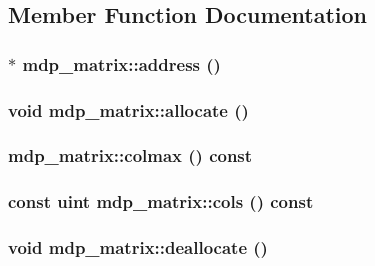\subsection{Member Function Documentation}
\hypertarget{classmdp__matrix_a557c3deb958c09b99f045df8d41a506e}{
\subsubsection[{address}]{ $\ast$ mdp\_\-matrix::address ()}}
\label{classmdp__matrix_a557c3deb958c09b99f045df8d41a506e}
\hypertarget{classmdp__matrix_a1a9cef75d472f8e7ab0665de46321030}{
\subsubsection[{allocate}]{\setlength{\rightskip}{0pt plus 5cm}void mdp\_\-matrix::allocate ()}}
\label{classmdp__matrix_a1a9cef75d472f8e7ab0665de46321030}
\hypertarget{classmdp__matrix_a006f666092b7aea1180728216474d13e}{
\subsubsection[{colmax}]{ mdp\_\-matrix::colmax () const}}
\label{classmdp__matrix_a006f666092b7aea1180728216474d13e}
\hypertarget{classmdp__matrix_a432ee1e1596f14d6b5899f857f5989e6}{
\subsubsection[{cols}]{\setlength{\rightskip}{0pt plus 5cm}const {\bf uint} mdp\_\-matrix::cols () const}}
\label{classmdp__matrix_a432ee1e1596f14d6b5899f857f5989e6}
\hypertarget{classmdp__matrix_a37512f689166e890038ec9688d3a171e}{
\subsubsection[{deallocate}]{\setlength{\rightskip}{0pt plus 5cm}void mdp\_\-matrix::deallocate ()}}
